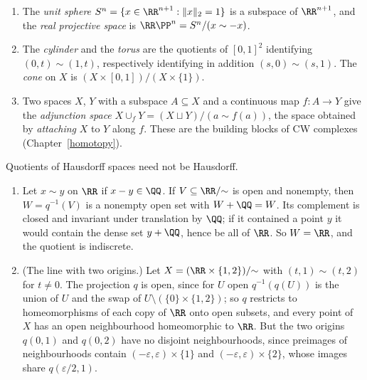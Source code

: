 \begin{example}\label{general-topology:example-quotients}
\begin{enumerate}
\item The \emph{unit sphere} $S^n = \{x \in \RR^{n+1} : \|x\|_2 = 1\}$ is a subspace of $\RR^{n+1}$, and the \emph{real projective space} is
$\RR\PP^n = S^n/(x \sim -x)$.
\item The \emph{cylinder} and the \emph{torus} are the quotients of $[0,1]^2$ identifying $(0, t) \sim (1, t)$, respectively identifying in addition
$(s, 0) \sim (s, 1)$. The \emph{cone} on $X$ is $(X \times [0,1])/(X \times \{1\})$.
\item Two spaces $X$, $Y$ with a subspace $A \subseteq X$ and a continuous map $f \colon A \to Y$ give the \emph{adjunction space}
$X \cup_f Y = (X \sqcup Y)/(a \sim f(a))$, the space obtained by \emph{attaching} $X$ to $Y$ along $f$. These are the building blocks of CW
complexes (Chapter~\ref{homotopy}).
\end{enumerate}
\end{example}

\begin{counterexample}\label{general-topology:counterexample-bad-quotients}
Quotients of Hausdorff spaces need not be Hausdorff.
\begin{enumerate}
\item Let $x \sim y$ on $\RR$ if $x - y \in \QQ$. If $V \subseteq \RR/{\sim}$ is open and nonempty, then $W = q^{-1}(V)$ is a nonempty open set with
$W + \QQ = W$. Its complement is closed and invariant under translation by $\QQ$; if it contained a point $y$ it would contain the dense set $y + \QQ$,
hence be all of $\RR$. So $W = \RR$, and the quotient is indiscrete.
\item (The line with two origins.) Let $X = (\RR \times \{1, 2\})/{\sim}$ with $(t, 1) \sim (t, 2)$ for $t \neq 0$. The projection $q$ is open, since for
$U$ open $q^{-1}(q(U))$ is the union of $U$ and the swap of $U \setminus (\{0\} \times \{1, 2\})$; so $q$ restricts to homeomorphisms of each copy of $\RR$
onto open subsets, and every point of $X$ has an open neighbourhood homeomorphic to $\RR$. But the two origins $q(0, 1)$ and $q(0, 2)$ have no
disjoint neighbourhoods, since preimages of neighbourhoods contain $(-\varepsilon, \varepsilon) \times \{1\}$ and $(-\varepsilon, \varepsilon) \times \{2\}$,
whose images share $q(\varepsilon/2, 1)$.
\end{enumerate}
\end{counterexample}

